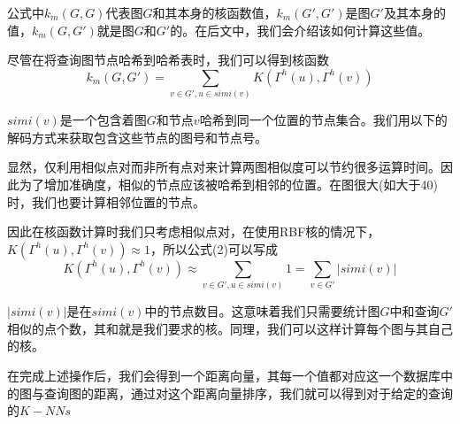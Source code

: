 \documentclass{article}
\begin{document}
公式中$k_{m}(G,G)$代表图$G$和其本身的核函数值，$k_{m}(G',G')$是图$G'$及其本身的值，$k_{m}(G,G')$就是图$G$和$G'$的。在后文中，我们会介绍该如何计算这些值。

尽管在将查询图节点哈希到哈希表时，我们可以得到核函数
\begin{equation}
k_{m}(G,G')=\sum_{v\in G',u\in simi(v)}K(\Gamma^{h}(u),\Gamma^{h}(v))
\end{equation}

$simi(v)$是一个包含着图$G$和节点$v$哈希到同一个位置的节点集合。我们用以下的解码方式来获取包含这些节点的图号和节点号。

显然，仅利用相似点对而非所有点对来计算两图相似度可以节约很多运算时间。因此为了增加准确度，相似的节点应该被哈希到相邻的位置。在图很大(如大于40)时，我们也要计算相邻位置的节点。

因此在核函数计算时我们只考虑相似点对，在使用RBF核的情况下，$K(\Gamma^{h}(u),\Gamma^{h}(v))\approx1$，所以公式(2)可以写成
\begin{equation}
    K(\Gamma^{h}(u),\Gamma^{h}(v))\approx\sum_{v\in G',u\in simi(v)}1=\sum_{v\in G'}|simi(v)| 
\end{equation}

$|simi(v)|$是在$simi(v)$中的节点数目。这意味着我们只需要统计图$G$中和查询$G'$相似的点个数，其和就是我们要求的核。同理，我们可以这样计算每个图与其自己的核。

在完成上述操作后，我们会得到一个距离向量，其每一个值都对应这一个数据库中的图与查询图的距离，通过对这个距离向量排序，我们就可以得到对于给定的查询的$K-NNs$

\ifx\allfiles\undefined
\end{document}
